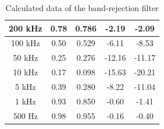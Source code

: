 \documentclass{article}
\begin{document}
\begin{table}[H]
\begin{tabular}{|c|c|c|c|c|}
200 kHz   & 0.78                                                                      & 0.786                                                                                 & -2.19                                                                                & -2.09                                                                                           \\ \hline
100 kHz   & 0.50                                                                      & 0.529                                                                                 & -6.11                                                                                & -8.53                                                                                           \\ \hline
50 kHz    & 0.25                                                                      & 0.276                                                                                 & -12.16                                                                               & -11.17                                                                                          \\ \hline
10 kHz    & 0.17                                                                      & 0.098                                                                                 & -15.63                                                                               & -20.21                                                                                          \\ \hline
5 kHz     & 0.39                                                                      & 0.280                                                                                 & -8.22                                                                                & -11.04                                                                                          \\ \hline
1 kHz     & 0.93                                                                      & 0.850                                                                                 & -0.60                                                                                & -1.41                                                                                           \\ \hline
500 Hz    & 0.98                                                                      & 0.955                                                                                 & -0.16                                                                                & -0.40                                                                                           \\ \hline
\end{tabular}
\caption{Calculated data of the band-rejection filter}
\end{table}
\end{document}
